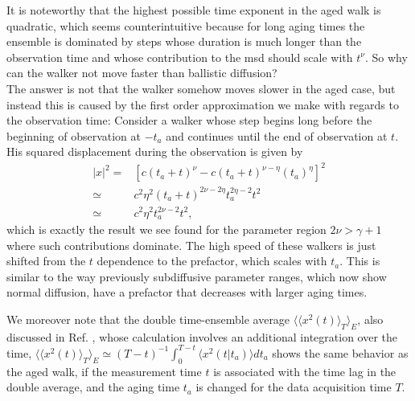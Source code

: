 It is noteworthy that the highest possible time exponent in the aged walk is quadratic, which seems counterintuitive because for long aging times the ensemble is dominated by steps whose duration is much longer than the observation time and whose contribution to the \gls*{msd} should scale with $t^{\nu}$. So why can the walker not move faster than ballistic diffusion? \\
The answer is not that the walker somehow moves slower in the aged case, but instead this is caused by the first order approximation we make with regards to the observation time: Consider a walker whose step begins long before the beginning of observation at $-t_a$ and continues until the end of observation at $t$. His squared displacement during the observation is given by
%
\begin{align}
|x|^2 =& [c (t_a+t)^{\nu} - c (t_a+t)^{\nu-\eta} (t_a)^{\eta} ]^2\\
\simeq & c^2 \eta^2  (t_a+t)^{2\nu-2\eta} t_a^{2 \eta -2} t^2 \\
\simeq & c^2 \eta^2 t_a^{2 \nu -2} t^2 ,
\end{align}
%
which is exactly the result we see found for the parameter region $2\nu > \gamma+1$ where such contributions dominate. The high speed of these walkers is just shifted from the $t$ dependence to the prefactor, which scales with $t_a$. This is similar to the way previously subdiffusive parameter ranges, which now show normal diffusion, have a prefactor that decreases with larger aging times.

We moreover note that the double time-ensemble average $\langle \langle x^2 (t) \rangle_T \rangle_E$, also discussed in Ref. 
\cite{radons2018}, 
whose calculation involves an additional integration over the time, $\langle \langle x^2 (t) \rangle_T \rangle_E \simeq (T-t)^{-1} \int_0^{T-t} \langle x^2 (t|t_a) \rangle dt_a$  shows the same behavior as the aged walk, if the measurement time $t$ is associated with the time lag in the double average, and the aging time $t_a$ is changed for the data acquisition time $T$.   

